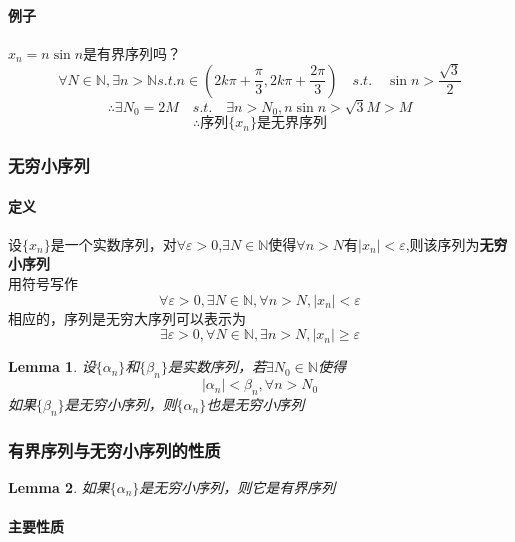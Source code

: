 \documentclass[11pt,hyperref,a4paper,UTF8]{ctexart}
\newtheorem{lemma}{Lemma}[subsection]
\begin{document}
\begin{CJK}{UTF8}{gkai}
\paragraph{例子\\}

$x_n=n\sin n$是有界序列吗？
\[\forall N \in \mathbb{N} ,\exists n> \mathbb{N} s. t. n \in (2k\pi+\frac{\pi}{3},2k\pi+\frac{2\pi}{3})\quad  s.t. \quad  \sin n>\frac{\sqrt{3}}{2}\]
\[\therefore \exists N_0=2M \quad  s.t.\quad \exists n>N_0,n \sin n > \sqrt{3}M>M\]
\[\therefore \text{序列} \{x_n\} \text{是无界序列}\]


\subsubsection{无穷小序列}
\paragraph{定义\\}
设$\{x_n\}$是一个实数序列，对$\forall \varepsilon > 0  $,$\exists N\in \mathbb{N}$使得$\forall n > N$有$|x_n|<\varepsilon$,则该序列为\textbf{无穷小序列}\\
用符号写作
\[\forall \varepsilon > 0 ,\exists N\in \mathbb{N},\forall n > N, |x_n|  <   \varepsilon \]
相应的，序列是无穷大序列可以表示为\\
\[\exists \varepsilon > 0 ,\forall N\in \mathbb{N},\exists n > N, |x_n| \geq \varepsilon \]
\begin{lemma}
设$\{\alpha_n\}$和$\{\beta_n\}$是实数序列，若$\exists N_0\in \mathbb{N}$使得
\[|\alpha_n| < \beta_n,\forall n > N_0\]
如果$\{\beta _n\}$是无穷小序列，则$\{\alpha _n\}$也是无穷小序列\\
\end{lemma}

\subsubsection{有界序列与无穷小序列的性质}

\begin{lemma}
如果$\{\alpha_n\}$是无穷小序列，则它是有界序列\\
\end{lemma}
\paragraph{主要性质}


\end{CJK}
\end{document}
